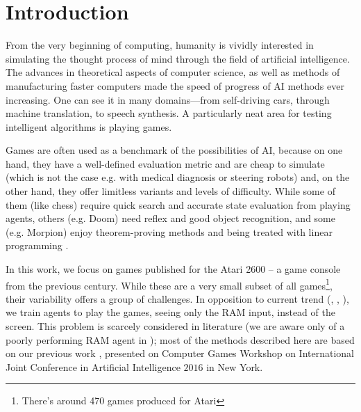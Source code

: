 \chapter*{Introduction}
From the very beginning of computing, humanity is vividly interested in simulating the thought process of mind through the field of artificial intelligence. The advances in theoretical aspects of computer science, as well as methods of manufacturing faster computers made the speed of progress of AI methods ever increasing. One can see it in many domains---from self-driving cars, through machine translation, to speech synthesis. A particularly neat area for testing intelligent algorithms is playing games.

Games are often used as a benchmark of the possibilities of AI, because on one hand, they have a well-defined evaluation metric and are cheap to simulate (which is not the case e.g. with medical diagnosis or steering robots) and, on the other hand, they offer limitless variants and levels of difficulty. While some of them (like chess) require quick search and accurate state evaluation from playing agents, others (e.g. Doom) need reflex and good object recognition, and some (e.g. Morpion) enjoy theorem-proving methods and being treated with linear programming \cite{morpion}.


In this work, we focus on games published for the Atari 2600 -- a game console from the previous century. While these are a very small subset of all games\footnote{There's around 470 games produced for Atari}, their variability offers a group of challenges. In opposition to current trend (\cite{nips-dqn}, \cite{nature-dqn}, \cite{a3c}), we train agents to play the games, seeing only the RAM input, instead of the screen. This problem is scarcely considered in literature (we are aware only of a poorly performing RAM agent in \cite{ale}); most of the methods described here are based on our previous work \cite{our-paper}, presented on Computer Games Workshop on International Joint Conference in Artificial Intelligence $2016$ in New York.



